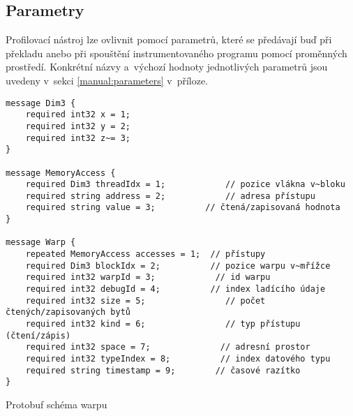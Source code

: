 \subsection{Parametry}
\label{sec:parameters}
Profilovací nástroj lze ovlivnit pomocí parametrů, které se předávají buď při překladu anebo při spouštění instrumentovaného programu pomocí proměnných prostředí. Konkrétní názvy a~výchozí hodnoty jednotlivých parametrů jsou uvedeny v~sekci \ref{manual:parameters} v~příloze.

\begin{listing}
\begin{verbatim}
message Dim3 {
	required int32 x = 1;
	required int32 y = 2;
	required int32 z~= 3;
}

message MemoryAccess {
	required Dim3 threadIdx = 1;			// pozice vlákna v~bloku
	required string address = 2;			// adresa přístupu
	required string value = 3;	  		// čtená/zapisovaná hodnota
}
	
message Warp {
	repeated MemoryAccess accesses = 1;	 // přístupy
	required Dim3 blockIdx = 2;			 // pozice warpu v~mřížce
	required int32 warpId = 3;			  // id warpu
	required int32 debugId = 4;			 // index ladícího údaje
	required int32 size = 5;			    // počet čtených/zapisovaných bytů
	required int32 kind = 6;			    // typ přístupu (čtení/zápis)
	required int32 space = 7;			   // adresní prostor
	required int32 typeIndex = 8;		   // index datového typu
	required string timestamp = 9;		  // časové razítko
}
\end{verbatim}
\caption{Protobuf schéma warpu}
\label{code:protobufaccess}
\end{listing}

